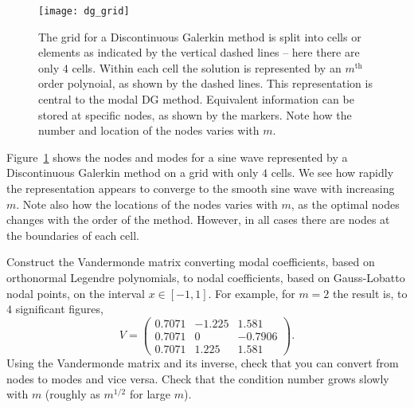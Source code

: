 \begin{figure}[t]
\centering
\texttt{[image: dg\_grid]}
\caption[The grid for a Discontinuous Galerkin method]
{\label{fig:dg_grid} The grid for a Discontinuous Galerkin method is split into
cells or elements as indicated by the vertical dashed lines -- here there are
only $4$ cells. Within each cell the solution is represented by an
$m^{\text{th}}$ order polynoial, as shown by the dashed lines. This
representation is central to the modal DG method. Equivalent information can be
stored at specific nodes, as shown by the markers. Note how the number and
location of the nodes varies with $m$. \\
}
\end{figure}
%
Figure~\ref{fig:dg_grid} shows the nodes and modes for a sine wave represented
by a Discontinuous Galerkin method on a grid with only $4$ cells. We see how
rapidly the representation appears to converge to the smooth sine wave with
increasing $m$. Note also how the locations of the nodes varies with $m$, as the
optimal nodes changes with the order of the method. However, in all cases there
are nodes at the boundaries of each cell.

\begin{exercise}
{Construct the Vandermonde matrix converting modal coefficients, based on
orthonormal Legendre polynomials, to nodal coefficients, based on Gauss-Lobatto
nodal points, on the interval $x \in [-1, 1]$. For example, for $m=2$ the result
is, to $4$ significant figures,
%
\begin{equation*}
  V = \begin{pmatrix}
        0.7071 & -1.225 & 1.581 \\
        0.7071 & 0 & -0.7906 \\
        0.7071 & 1.225 & 1.581
      \end{pmatrix}.
\end{equation*}
%
Using the Vandermonde matrix and its inverse, check that you can convert from
nodes to modes and vice versa. Check that the condition number grows slowly with
$m$ (roughly as $m^{1/2}$ for large $m$).}
\end{exercise}


